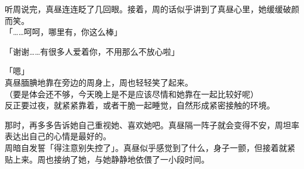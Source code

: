 听周说完，真昼连连眨了几回眼。接着，周的话似乎讲到了真昼心里，她缓缓破颜而笑。\\

「……呵呵，哪里有，你这么棒」

「谢谢……有很多人爱着你，不用那么不放心啦」

「嗯」\\

真昼腼腆地靠在旁边的周身上，周也轻轻笑了起来。\\

（要是体会还不够，今天晚上是不是应该尽情和她靠在一起比较好呢）\\

反正要过夜，就紧紧靠着，或者干脆一起睡觉，自然形成紧密接触的环境。

那时，再多多告诉她自己重视她、喜欢她吧。真昼隔一阵子就会变得不安，周坦率表达出自己的心情是最好的。\\

周暗自发誓「得注意别失控了」。真昼似乎感觉到了什么，身子一颤，但接着就紧贴上来。周也接纳了她，与她静静地依偎了一小段时间。
